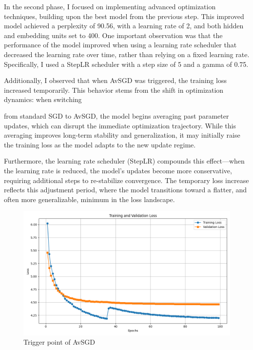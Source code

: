 \documentclass[a4paper]{article}
\begin{document}
In the second phase, I focused on implementing advanced optimization techniques, building upon
 the best model from the previous step. This improved model achieved a perplexity of 90.56, with
  a learning rate of 2, and both hidden and embedding units set to 400. One important observation
   was that the performance of the model improved when using a learning rate scheduler that decreased
    the learning rate over time, rather than relying on a fixed learning rate. Specifically, I used 
    a StepLR scheduler with a step size of 5 and a gamma of 0.75.

    Additionally, I observed that when AvSGD was triggered, the training loss increased 
    temporarily. This behavior stems from the shift in optimization dynamics: when switching
    
    from standard SGD to AvSGD, the model begins averaging past parameter updates, which can 
    disrupt the immediate optimization trajectory. While this averaging improves long-term 
    stability and generalization, it may initially raise the training loss as the model adapts
     to the new update regime.

    Furthermore, the learning rate scheduler (StepLR) compounds this effect—when the learning 
    rate is reduced, the model’s updates become more conservative, requiring additional steps 
    to re-stabilize convergence. The temporary loss increase reflects this adjustment period, 
    where the model transitions toward a flatter, and often more generalizable, minimum in the
     loss landscape.

     \begin{figure}[h!]
      \centering
      \includegraphics[width=0.8\linewidth]{images/part_A_avsdg.png}
      \caption{Trigger point of AvSGD}
      \label{fig:plot-avsdg}
      \end{figure}
\newpage
\end{document}
